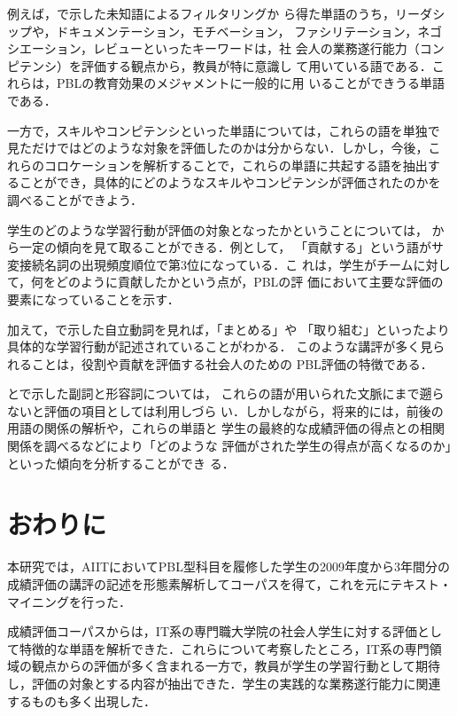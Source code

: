 \documentclass[submit]{ipsj}
\begin{document}
例えば，で示した未知語によるフィルタリングか
ら得た単語のうち，リーダシップや，ドキュメンテーション，モチベーション，
ファシリテーション，ネゴシエーション，レビューといったキーワードは，社
会人の業務遂行能力（コンピテンシ）を評価する観点から，教員が特に意識し
て用いている語である．これらは，PBLの教育効果のメジャメントに一般的に用
いることができうる単語である．

一方で，スキルやコンピテンシといった単語については，これらの語を単独で
見ただけではどのような対象を評価したのかは分からない．しかし，今後，こ
れらのコロケーションを解析することで，これらの単語に共起する語を抽出す
ることができ，具体的にどのようなスキルやコンピテンシが評価されたのかを
調べることができよう．

学生のどのような学習行動が評価の対象となったかということについては，
から一定の傾向を見て取ることができる．例として，
「貢献する」という語がサ変接続名詞の出現頻度順位で第3位になっている．こ
れは，学生がチームに対して，何をどのように貢献したかという点が，PBLの評
価において主要な評価の要素になっていることを示す．

加えて，で示した自立動詞を見れば，「まとめる」や
「取り組む」といったより具体的な学習行動が記述されていることがわかる．
このような講評が多く見られることは，役割や貢献を評価する社会人のための
PBL評価の特徴である．

とで示した副詞と形容詞については，
これらの語が用いられた文脈にまで遡らないと評価の項目としては利用しづら
い．しかしながら，将来的には，前後の用語の関係の解析や，これらの単語と
学生の最終的な成績評価の得点との相関関係を調べるなどにより「どのような
評価がされた学生の得点が高くなるのか」といった傾向を分析することができ
る．

\section{おわりに}\label{sec:結語}

本研究では，AIITにおいてPBL型科目を履修した学生の2009年度から3年間分の
成績評価の講評の記述を形態素解析してコーパスを得て，これを元にテキスト・
マイニングを行った．

成績評価コーパスからは，IT系の専門職大学院の社会人学生に対する評価とし
て特徴的な単語を解析できた．これらについて考察したところ，IT系の専門領
域の観点からの評価が多く含まれる一方で，教員が学生の学習行動として期待
し，評価の対象とする内容が抽出できた．学生の実践的な業務遂行能力に関連
するものも多く出現した．
\end{document}
